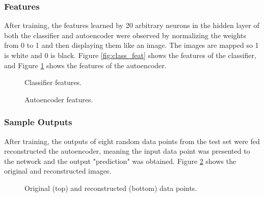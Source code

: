 \documentclass[a4paper, 12pt, titlepage]{article}
\newcommand{\figRef}[1]{Figure \ref{#1}}
\begin{document}
  \subsubsection{Features}
  \par After training, the features learned by 20 arbitrary neurons in the
  hidden layer of both the classifier and autoencoder were observed by
  normalizing the weights from 0 to 1 and then displaying them like an image.
  The images are mapped so 1 is white and 0 is black.
  \figRef{fig:class_feat} shows the features of the classifier, and
  \figRef{fig:auto_feat} shows the features of the autoencoder.
  \begin{figure}[htb]
    \begin{minipage}{0.45\textwidth}
      \centering
      
      \caption{Classifier features.}
      \label{fig:class_feat}
    \end{minipage}
    \hfill
    \begin{minipage}{0.45\textwidth}
      \centering
      
      \caption{Autoencoder features.}
      \label{fig:auto_feat}
    \end{minipage}
  \end{figure}

  \subsubsection{Sample Outputs}
  \par After training, the outputs of eight random data points from the test
  set were fed reconstructed the autoencoder, meaning the input data point was
  presented to the network and the output "prediction" was obtained.
  \figRef{fig:samples} shows the original and reconstructed images.
  \begin{figure}[htb]
    \centering
    
    \caption{Original (top) and reconstructed (bottom) data points.}
    \label{fig:samples}
  \end{figure}
\end{document}
